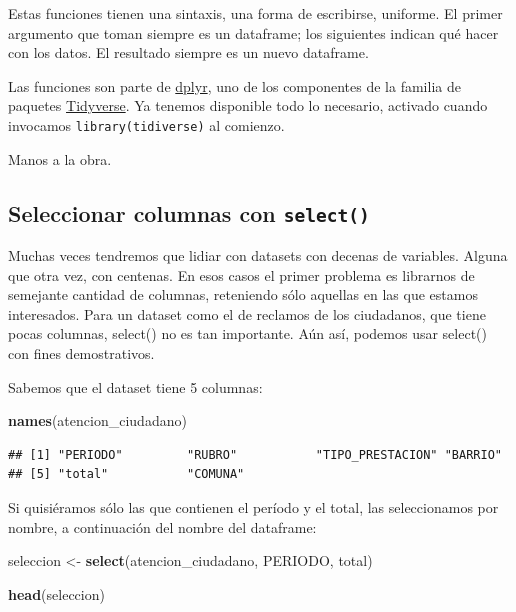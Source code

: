 \documentclass[]{book}
\newenvironment{Shaded}{\begin{snugshade}}{\end{snugshade}}
\newcommand{\KeywordTok}[1]{\textcolor[rgb]{0.13,0.29,0.53}{\textbf{#1}}}
\newcommand{\StringTok}[1]{\textcolor[rgb]{0.31,0.60,0.02}{#1}}
\newcommand{\NormalTok}[1]{#1}
\begin{document}
Estas funciones tienen una sintaxis, una forma de escribirse, uniforme.
El primer argumento que toman siempre es un dataframe; los siguientes
indican qué hacer con los datos. El resultado siempre es un nuevo
dataframe.

Las funciones son parte de \href{http://dplyr.tidyverse.org/}{dplyr},
uno de los componentes de la familia de paquetes
\href{https://www.tidyverse.org/}{Tidyverse}. Ya tenemos disponible todo
lo necesario, activado cuando invocamos \texttt{library(tidiverse)} al
comienzo.

Manos a la obra.

\subsection{\texorpdfstring{Seleccionar columnas con
\texttt{select()}}{Seleccionar columnas con select()}}\label{seleccionar-columnas-con-select}

Muchas veces tendremos que lidiar con datasets con decenas de variables.
Alguna que otra vez, con centenas. En esos casos el primer problema es
librarnos de semejante cantidad de columnas, reteniendo sólo aquellas en
las que estamos interesados. Para un dataset como el de reclamos de los
ciudadanos, que tiene pocas columnas, select() no es tan importante. Aún
así, podemos usar select() con fines demostrativos.

Sabemos que el dataset tiene 5 columnas:

\begin{Shaded}
\begin{Highlighting}[]
\KeywordTok{names}\NormalTok{(atencion_ciudadano)}
\end{Highlighting}
\end{Shaded}

\begin{verbatim}
## [1] "PERIODO"         "RUBRO"           "TIPO_PRESTACION" "BARRIO"         
## [5] "total"           "COMUNA"
\end{verbatim}

Si quisiéramos sólo las que contienen el período y el total, las
seleccionamos por nombre, a continuación del nombre del dataframe:

\begin{Shaded}
\begin{Highlighting}[]
\NormalTok{seleccion <-}\StringTok{ }\KeywordTok{select}\NormalTok{(atencion_ciudadano, PERIODO, total)}

\KeywordTok{head}\NormalTok{(seleccion)}
\end{Highlighting}
\end{Shaded}
\end{document}
